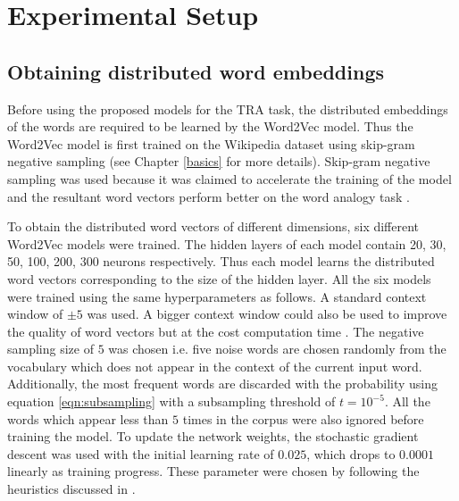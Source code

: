 \section{Experimental Setup}

\subsection{Obtaining distributed word embeddings} \label{get_word_embeddings}

Before using the proposed models for the TRA task, the distributed embeddings of the words are required to be learned by the Word2Vec model. Thus the Word2Vec model is first trained on the Wikipedia dataset using skip-gram negative sampling (see Chapter \ref{basics} for more details). Skip-gram negative sampling was used because it was claimed to accelerate the training of the model and the resultant word vectors perform better on the word analogy task \cite{w2v:mikolov_2013_efficient, w2v:mikolov_2013_distributed}. 

To obtain the distributed word vectors of different dimensions, six different Word2Vec models were trained. The hidden layers of each model contain 20, 30, 50, 100, 200, 300 neurons respectively. Thus each model learns the distributed word vectors corresponding to the size of the hidden layer. All the six models were trained using the same hyperparameters as follows. A standard context window of $\pm 5$ was used. A bigger context window could also be used to improve the quality of word vectors but at the cost computation time \cite{w2v:mikolov_2013_distributed}. The negative sampling size of $5$ was chosen i.e. five noise words are chosen randomly from the vocabulary which does not appear in the context of the current input word. Additionally, the most frequent words are discarded with the probability using equation \ref{eqn:subsampling} with a subsampling threshold of $t = 10^{-5}$. All the words which appear less than $5$ times in the corpus were also ignored before training the model. To update the network weights, the stochastic gradient descent was used \cite{w2v:parameter_learning, w2v:mikolov_2013_distributed} with the initial learning rate of $0.025$, which drops to $0.0001$ linearly as training progress. These parameter were chosen by following the heuristics discussed in \cite{w2v:mikolov_2013_efficient, w2v:mikolov_2013_distributed}.

